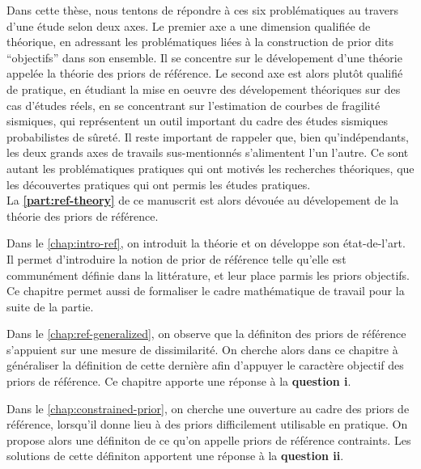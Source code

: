 Dans cette thèse, nous tentons de répondre à ces six problématiques au travers d'une étude selon deux axes. Le premier axe a une dimension qualifiée de théorique, en adressant les problématiques liées à la construction de prior dits ``objectifs'' dans son ensemble. Il se concentre sur le dévelopement d'une théorie appelée la théorie des priors de référence. Le second axe est alors plutôt qualifié de pratique, en étudiant la mise en oeuvre des dévelopement théoriques sur des cas d'études réels, en se concentrant sur l'estimation de courbes de fragilité sismiques, qui représentent un outil important du cadre des études sismiques probabilistes de sûreté.
Il reste important de rappeler que, bien qu'indépendants, les deux grands axes de travails sus-mentionnés s'alimentent l'un l'autre. Ce sont autant les problématiques pratiques qui ont motivés les recherches théoriques, que les découvertes pratiques qui ont permis les études pratiques.\\






La \textbf{\cref{part:ref-theory}} de ce manuscrit est alors dévouée au dévelopement de la théorie des priors de référence.

\noindent
Dans le \cref{chap:intro-ref}, on introduit la théorie et on développe son état-de-l'art. Il permet d'introduire la notion de prior de référence telle qu'elle est communément définie dans la littérature, et leur place parmis les priors objectifs. Ce chapitre permet aussi de formaliser le cadre mathématique de travail pour la suite de la partie.

\noindent
Dans le \cref{chap:ref-generalized}, on observe que la définiton des priors de référence s'appuient sur une mesure de dissimilarité. On cherche alors dans ce chapitre à généraliser la définition de cette dernière afin d'appuyer le caractère objectif des priors de référence. Ce chapitre apporte une réponse à la \textbf{question i}.

\noindent
Dans le \cref{chap:constrained-prior}, on cherche une ouverture au cadre des priors de référence, lorsqu'il donne lieu à des priors difficilement utilisable en pratique. On propose alors une définiton de ce qu'on appelle priors de référence contraints. Les solutions de cette définiton apportent une réponse à la \textbf{question ii}.

